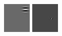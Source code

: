 \begin{figure}[ht]
 \includegraphics[width=\textwidth*11/100]{ch5/figures/firstgabor_C1.jpg}
 \includegraphics[width=\textwidth*11/100]{ch5/figures/firstgabor_C2.jpg}

\end{figure}
